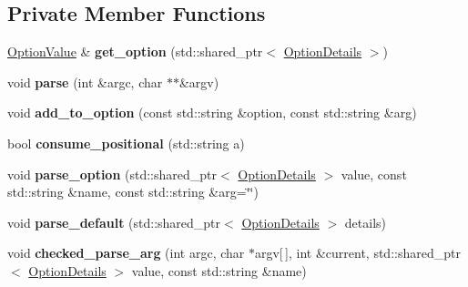 \subsection*{Private Member Functions}
\begin{DoxyCompactItemize}
\item 
\hyperlink{classcxxopts_1_1OptionValue}{Option\+Value} \& {\bfseries get\+\_\+option} (std\+::shared\+\_\+ptr$<$ \hyperlink{classcxxopts_1_1OptionDetails}{Option\+Details} $>$)\hypertarget{classcxxopts_1_1ParseResult_a6671596ebeb094b59a1ea08dec7e21e3}{}\label{classcxxopts_1_1ParseResult_a6671596ebeb094b59a1ea08dec7e21e3}

\item 
void {\bfseries parse} (int \&argc, char $\ast$$\ast$\&argv)\hypertarget{classcxxopts_1_1ParseResult_ad81a77df48524ac4598cc1d8a2742215}{}\label{classcxxopts_1_1ParseResult_ad81a77df48524ac4598cc1d8a2742215}

\item 
void {\bfseries add\+\_\+to\+\_\+option} (const std\+::string \&option, const std\+::string \&arg)\hypertarget{classcxxopts_1_1ParseResult_ad6c07a08104b19b677186ad6f06c3b98}{}\label{classcxxopts_1_1ParseResult_ad6c07a08104b19b677186ad6f06c3b98}

\item 
bool {\bfseries consume\+\_\+positional} (std\+::string a)\hypertarget{classcxxopts_1_1ParseResult_abbeb912ba353824c3a7c03b09d0c92c9}{}\label{classcxxopts_1_1ParseResult_abbeb912ba353824c3a7c03b09d0c92c9}

\item 
void {\bfseries parse\+\_\+option} (std\+::shared\+\_\+ptr$<$ \hyperlink{classcxxopts_1_1OptionDetails}{Option\+Details} $>$ value, const std\+::string \&name, const std\+::string \&arg=\char`\"{}\char`\"{})\hypertarget{classcxxopts_1_1ParseResult_a852a0fe7cc224cec36ad4070c505523a}{}\label{classcxxopts_1_1ParseResult_a852a0fe7cc224cec36ad4070c505523a}

\item 
void {\bfseries parse\+\_\+default} (std\+::shared\+\_\+ptr$<$ \hyperlink{classcxxopts_1_1OptionDetails}{Option\+Details} $>$ details)\hypertarget{classcxxopts_1_1ParseResult_ae3d580d84335f7df3f14a99791570c24}{}\label{classcxxopts_1_1ParseResult_ae3d580d84335f7df3f14a99791570c24}

\item 
void {\bfseries checked\+\_\+parse\+\_\+arg} (int argc, char $\ast$argv\mbox{[}$\,$\mbox{]}, int \&current, std\+::shared\+\_\+ptr$<$ \hyperlink{classcxxopts_1_1OptionDetails}{Option\+Details} $>$ value, const std\+::string \&name)\hypertarget{classcxxopts_1_1ParseResult_af6747ace765bba07d66dd4a96fb01a3e}{}\label{classcxxopts_1_1ParseResult_af6747ace765bba07d66dd4a96fb01a3e}

\end{DoxyCompactItemize}
